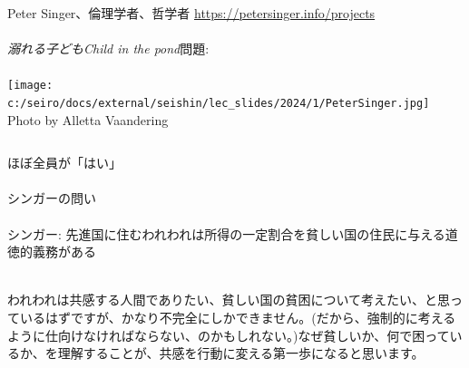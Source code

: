 \begin{frame}[label=PeterSinger]{}
\begin{columns}[T]
Peter Singer、倫理学者、哲学者 \url{https://petersinger.info/projects} \\~\\
\pause
\textit{溺れる子どもChild in the pond}問題:\\~\\
\hfill\hyperlink{PeterSingerEnglish}{}
\hfil\texttt{[image: c:/seiro/docs/external/seishin/lec\_slides/2024/1/PeterSinger.jpg]}\\
\hfil{\scriptsize Photo by Alletta Vaandering}
\end{columns}
\pause
ほぼ全員が「はい」\\~\\
\pause
シンガーの問い\\~\\
\pause
シンガー: 先進国に住むわれわれは所得の一定割合を貧しい国の住民に与える道徳的義務がある\\~\\
\pause
\begin{dinglist}{43}
\vspace{1.0ex}\setlength{\itemsep}{1.0ex}\setlength{\baselineskip}{12pt}
\item	われわれは共感する人間でありたい、貧しい国の貧困について考えたい、と思っているはずですが、かなり不完全にしかできません。(だから、強制的に考えるように仕向けなければならない、のかもしれない。)なぜ貧しいか、何で困っているか、を理解することが、共感を行動に変える第一歩になると思います。
\end{dinglist}
\end{frame}

